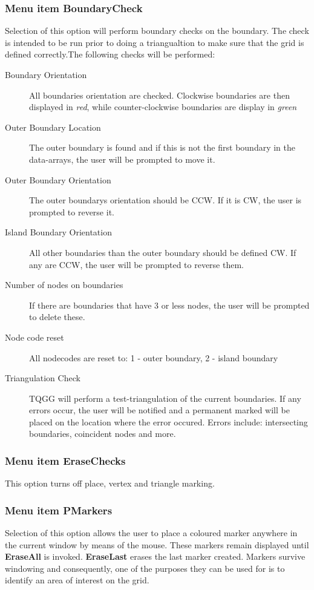 \documentclass{article}
\begin{document}
\subsubsection{Menu item BoundaryCheck}
Selection of this option will perform boundary checks on the boundary. The check is intended to be run prior to doing a triangualtion to make sure that the grid is defined correctly.The following checks will be performed:
\begin{description}
\item[Boundary Orientation] All boundaries orientation are checked. Clockwise boundaries are then displayed in \emph{red}, while counter-clockwise boundaries are display in \emph{green}
\item[Outer Boundary Location] The outer boundary is found and if this is not the first boundary in the data-arrays, the user will be prompted to move it.
\item[Outer Boundary Orientation] The outer boundarys orientation should be CCW. If it is CW, the user is prompted to reverse it.
\item[Island Boundary Orientation] All other boundaries than the outer boundary should be defined CW. If any are CCW, the user will be prompted to reverse them.
\item[Number of nodes on boundaries] If there are boundaries that have 3 or less nodes, the user will be prompted to delete these.
\item[Node code reset] All nodecodes are reset to: 1 - outer boundary, 2 - island boundary
\item[Triangulation Check] TQGG will perform a test-triangulation of the current boundaries. If any errors occur, the user will be notified and a permanent marked will be placed on the location where the error occured. Errors include: intersecting boundaries, coincident nodes and more.
\end{description}

\subsubsection{Menu item EraseChecks}
This option turns off place, vertex and triangle marking.

\subsubsection{Menu item PMarkers}
Selection of this option allows the user to place a coloured marker anywhere in the current window by means of the mouse. These markers remain displayed until \textbf{EraseAll} is invoked. \textbf{EraseLast} erases the last marker created. Markers survive windowing and consequently, one of the purposes they can be used for is to identify an area of interest on the grid.
\end{document}
